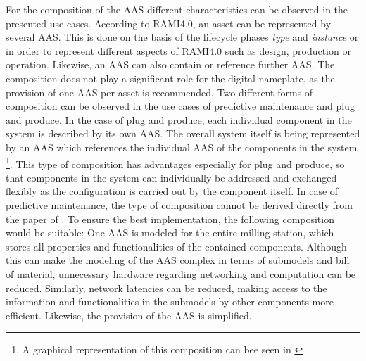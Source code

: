 For the composition of the \ac{AAS} different characteristics can be observed in the presented use cases. According to \ac{RAMI4.0}, an asset can be represented by several \ac{AAS}. This is done on the basis of the lifecycle phases \textit{type} and \textit{instance} or in order to represent different aspects of \ac{RAMI4.0} such as design, production or operation. Likewise, an \ac{AAS} can also contain or reference further \ac{AAS}. The composition does not play a significant role for the digital nameplate, as the provision of one \ac{AAS} per asset is recommended. Two different forms of composition can be observed in the use cases of predictive maintenance and plug and produce. In the case of plug and produce, each individual component in the system is described by its own \ac{AAS}. The overall system itself is being represented by an \ac{AAS} which references the individual \ac{AAS} of the components in the system \footnote{A graphical representation of this composition can bee seen in \citet[p. 246, figure 3]{Schweizer2021ProcessSystems}}. This type of composition has advantages especially for plug and produce, so that components in the system can individually be addressed and exchanged flexibly as the configuration is carried out by the component itself. In case of predictive maintenance, the type of composition cannot be derived directly from the paper of \citeauthor{Cavalieri2020AShell}. To ensure the best implementation, the following composition would be suitable: One \ac{AAS} is modeled for the entire milling station, which stores all properties and functionalities of the contained components. Although this can make the modeling of the \ac{AAS} complex in terms of submodels and bill of material, unnecessary hardware regarding networking and computation can be reduced. Similarly, network latencies can be reduced, making access to the information and functionalities in the submodels by other components more efficient. Likewise, the provision of the \ac{AAS} is simplified.